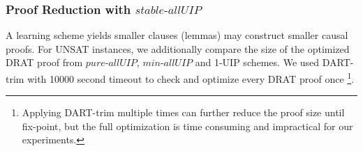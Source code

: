 \documentclass[runningheads]{llncs}
\newcommand{\allUip}{\textit{stable-allUIP}}
\newcommand{\allUipPure}{\textit{pure-allUIP}\xspace}
\newcommand{\allUipMin}{\textit{min-allUIP}\xspace}
\newcommand{\MapleIUIPPure}{\text{Maple-\allUipPure}}
\newcommand{\MapleIUIMin}{\text{Maple-\allUipMin}}
\newcommand{\nf}[1]{{\color{red}{#1}}}
\begin{document}



\subsubsection{Proof Reduction with $\allUip$}
A learning scheme yields smaller clauses (lemmas) may construct smaller causal proofs. For
UNSAT instances, we additionally compare the size of the optimized DRAT proof from $\allUipPure$, $\allUipMin$ and 1-UIP schemes. We used DART-trim \cite{wetzler2014drat} with 10000 second timeout to check and optimize every DRAT proof once \footnote{Applying DART-trim multiple times can further reduce the proof size until fix-point, but the full optimization is time consuming and impractical for our experiments.}.
\end{document}

